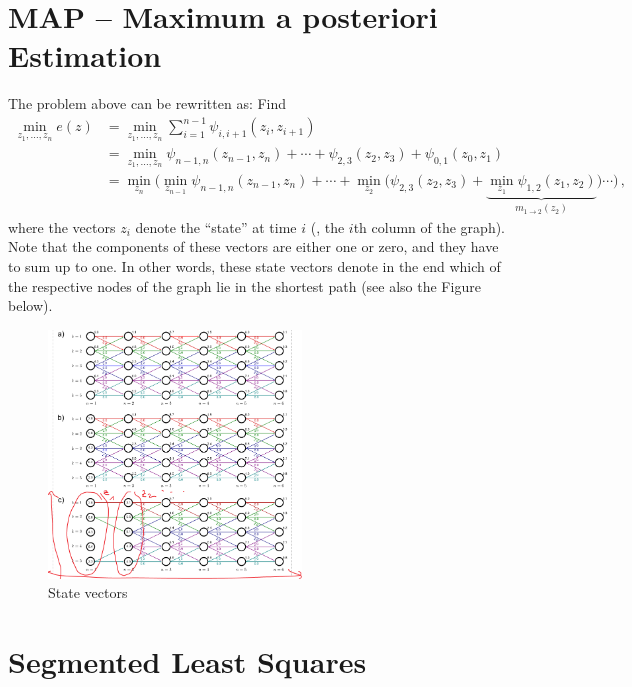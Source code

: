 \section*{MAP -- Maximum a posteriori Estimation}
The problem above can be rewritten as: Find
\begin{align*}
  \min_{z_1, \dotsc, z_n}e(z) &= \min_{z_1, \dotsc, z_n} \sum_{i=1}^{n-1} \psi_{i,i+1}(z_i, z_{i+1}) \\
                              &= \min_{z_1, \dotsc, z_n} \psi_{n-1,n}(z_{n-1}, z_n) + \dotsm + \psi_{2,3}(z_{2}, z_3) + \psi_{0,1}(z_{0}, z_1) \\
                              &= \min_{z_n}\Bigg(
                                \min_{z_{n-1}}\psi_{n-1,n}(z_{n-1},z_n) + \dotsm + \min_{z_2}\Big(
                                \psi_{2,3}(z_2, z_3) + \underbrace{\min_{z_1}\psi_{1,2}(z_1, z_2)}_{
                                m_{1\rightarrow 2}(z_2)
                                }
                                \Big) \dotsm
                                \Bigg)\,,
\end{align*}
where the vectors $z_i$ denote the ``state'' at time $i$ (\ie, the $i$th column
of the graph). Note that the components of these vectors are either one or zero,
and they have to sum up to one. In other words, these state vectors denote in
the end which of the respective nodes of the graph lie in the shortest path (see
also the Figure below).

\begin{figure}[htpb]
  \centering \includegraphics[width=0.6\textwidth]{Figures/state_vectors}
  \caption{State vectors}
\end{figure}

\section{Segmented Least Squares}

